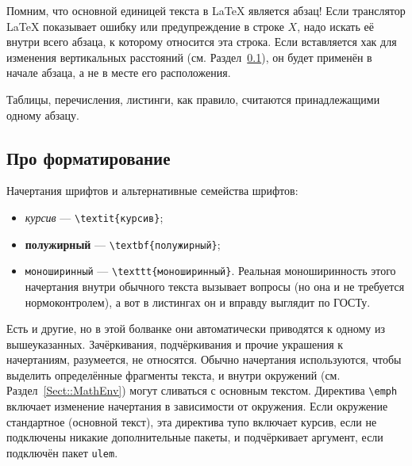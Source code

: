 \documentclass[14pt,russian]{scrartcl}
\begin{document}
Помним, что основной единицей текста в \LaTeX{} является абзац! Если транслятор \LaTeX{} показывает ошибку или предупреждение в строке $X$, надо искать её внутри всего абзаца, к которому относится эта строка. Если вставляется хак для изменения вертикальных расстояний (см. Раздел~\ref{sect:formatting}), он будет применён в начале абзаца, а не в месте его расположения.

Таблицы, перечисления, листинги, как правило, считаются принадлежащими одному абзацу.

\subsection{Про форматирование}\label{sect:formatting}

Начертания шрифтов и альтернативные семейства шрифтов:
\begin{itemize}
\item \textit{курсив} --- \texttt{\textbackslash textit\{курсив\}};
\item \textbf{полужирный} --- \texttt{\textbackslash textbf\{полужирный\}};
\item \texttt{моноширинный} --- \texttt{\textbackslash texttt\{моноширинный\}}. Реальная моноширинность этого начертания внутри обычного текста вызывает вопросы (но она и не требуется нормоконтролем), а вот в листингах он и вправду выглядит по ГОСТу.
\end{itemize}

Есть и другие, но в этой болванке они автоматически приводятся к одному из вышеуказанных. Зачёркивания, подчёркивания и прочие украшения к начертаниям, разумеется, не относятся. Обычно начертания используются, чтобы выделить определённые фрагменты текста, и внутри окружений (см. Раздел~\ref{Sect::MathEnv}) могут сливаться с основным текстом. Директива \texttt{\textbackslash emph} включает изменение начертания в зависимости от окружения. Если окружение стандартное (основной текст), эта директива тупо включает курсив, если не подключены никакие дополнительные пакеты, и подчёркивает аргумент, если подключён пакет \texttt{ulem}.
 
\end{document}
